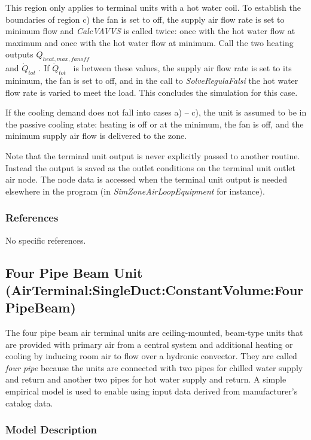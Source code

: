 This region only applies to terminal units with a hot water coil. To establish the boundaries of region c) the fan is set to off, the supply air flow rate is set to minimum flow and \emph{CalcVAVVS} is called twice: once with the hot water flow at maximum and once with the hot water flow at minimum. Call the two heating outputs \({\dot Q_{heat,max,fanoff}}\)\\
and \({\dot Q_{tot}}\) . If \({\dot Q_{tot}}\) ~is between these values, the supply air flow rate is set to its minimum, the fan is set to off, and in the call to \emph{SolveRegulaFalsi} the hot water flow rate is varied to meet the load. This concludes the simulation for this case.

If the cooling demand does not fall into cases a) -- c), the unit is assumed to be in the passive cooling state: heating is off or at the minimum, the fan is off, and the minimum supply air flow is delivered to the zone.

Note that the terminal unit output is never explicitly passed to another routine. Instead the output is saved as the outlet conditions on the terminal unit outlet air node. The node data is accessed when the terminal unit output is needed elsewhere in the program (in \emph{SimZoneAirLoopEquipment} for instance).

\subsubsection{References}\label{references-3}

No specific references.

\subsection{Four Pipe Beam Unit (AirTerminal:SingleDuct:ConstantVolume:FourPipeBeam)}\label{four-pipe-beam-unit-airterminalsingleductconstantvolumefourpipebeam}

The four pipe beam air terminal units are ceiling-mounted, beam-type units that are provided with primary air from a central system and additional heating or cooling by inducing room air to flow over a hydronic convector. They are called \emph{four pipe} because the units are connected with two pipes for chilled water supply and return and another two pipes for hot water supply and return. A simple empirical model is used to enable using input data derived from manufacturer's catalog data.

\subsubsection{Model Description}\label{model-description-1-000}

